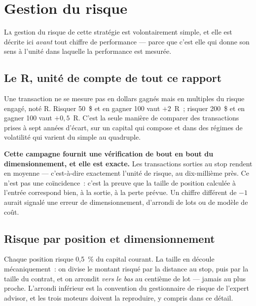 \section{Gestion du risque}
\label{sec:x10_risque}

\lettrine[lines=2, findent=2pt, nindent=0pt]{L}{a} gestion du risque de cette
stratégie est volontairement simple, et elle est décrite ici \emph{avant}
tout chiffre de performance --- parce que c'est elle qui donne son sens à
l'unité dans laquelle la performance est mesurée.

\subsection{Le R, unité de compte de tout ce rapport}

Une transaction ne se mesure pas en dollars gagnés mais en multiples du risque
engagé, noté R. Risquer 50~\$ et en gagner 100 vaut $+2$~R~; risquer 200~\$ et
en gagner 100 vaut $+0{,}5$~R. C'est la seule manière de comparer des
transactions prises à sept années d'écart, sur un capital qui compose et dans
des régimes de volatilité qui varient du simple au quadruple.

\begin{insightbox}
\textbf{Cette campagne fournit une vérification de bout en bout du
dimensionnement, et elle est exacte.} Les transactions sorties au stop rendent
en moyenne  --- c'est-à-dire exactement l'unité de
risque, au dix-millième près. Ce n'est pas une coïncidence~: c'est la preuve
que la taille de position calculée à l'entrée correspond bien, à la sortie, à
la perte prévue. Un chiffre différent de $-1$ aurait signalé une erreur de
dimensionnement, d'arrondi de lots ou de modèle de coût.
\end{insightbox}

\subsection{Risque par position et dimensionnement}

Chaque position risque 0,5~\% du capital courant. La taille en découle
mécaniquement~: on divise le montant risqué par la distance au stop, puis par
la taille du contrat, et on arrondit \emph{vers le bas} au centième de lot ---
jamais au plus proche. L'arrondi inférieur est la convention du gestionnaire
de risque de l'expert advisor, et les trois moteurs doivent la reproduire, y
compris dans ce détail.

